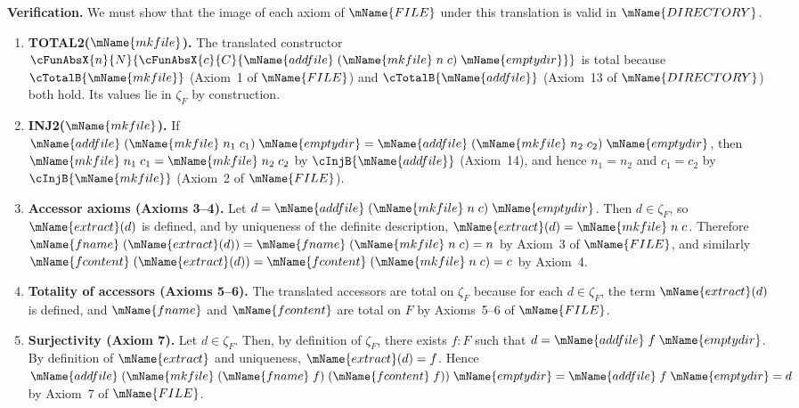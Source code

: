 \documentclass[11pt]{article}
\newcommand{\FILETYPE}{\mName{FILE}}
\newcommand{\DIR}{\mName{DIRECTORY}}
\newcommand{\mkfile}{\mName{mkfile}}
\newcommand{\fname}{\mName{fname}}
\newcommand{\fcontent}{\mName{fcontent}}
\begin{document}
\medskip
\noindent\textbf{Verification.}
We must show that the image of each axiom of $\FILETYPE$ under this
translation is valid in $\DIR$.

\begin{enumerate}
  \item \textbf{TOTAL2($\mkfile$).}
    The translated constructor
    $\cFunAbsX{n}{N}{\cFunAbsX{c}{C}{
        \mName{addfile}\;(\mkfile\;n\;c)\;\mName{emptydir}}}$
    is total because $\cTotalB{\mkfile}$ (Axiom~1 of $\FILETYPE$)
    and $\cTotalB{\mName{addfile}}$ (Axiom~13 of $\DIR$) both hold.
    Its values lie in $\zeta_F$ by construction.

  \item \textbf{INJ2($\mkfile$).}
    If $\mName{addfile}\;(\mkfile\;n_1\;c_1)\;\mName{emptydir}
      =
      \mName{addfile}\;(\mkfile\;n_2\;c_2)\;\mName{emptydir}$,
    then $\mkfile\;n_1\;c_1 = \mkfile\;n_2\;c_2$ by
    $\cInjB{\mName{addfile}}$ (Axiom~14), and hence
    $n_1 = n_2$ and $c_1 = c_2$ by $\cInjB{\mkfile}$
    (Axiom~2 of $\FILETYPE$).

  \item \textbf{Accessor axioms (Axioms 3--4).}
    Let $d = \mName{addfile}\;(\mkfile\;n\;c)\;\mName{emptydir}$.
    Then $d \in \zeta_F$, so $\mName{extract}(d)$ is defined, and
    by uniqueness of the definite description, $\mName{extract}(d) = \mkfile\;n\;c$.
    Therefore $\fname\;(\mName{extract}(d))
      = \fname\;(\mkfile\;n\;c) = n$
    by Axiom~3 of $\FILETYPE$, and similarly 
    $\fcontent\;(\mName{extract}(d))
      = \fcontent\;(\mkfile\;n\;c) = c$
    by Axiom~4.

  \item \textbf{Totality of accessors (Axioms 5--6).}
    The translated accessors are total on $\zeta_F$ because for each
    $d \in \zeta_F$, the term $\mName{extract}(d)$ is defined, and
    $\fname$ and $\fcontent$ are total on $F$ by Axioms~5--6 of
    $\FILETYPE$.

  \item \textbf{Surjectivity (Axiom 7).}
    Let $d \in \zeta_F$.  Then, by definition of $\zeta_F$, there
    exists $f : F$ such that 
    $d = \mName{addfile}\;f\;\mName{emptydir}$.
    By definition of $\mName{extract}$ and uniqueness,
    $\mName{extract}(d)=f$.  Hence
      $\mName{addfile}\;(\mkfile\;(\fname\;f)\;(\fcontent\;f))\;\mName{emptydir}
      =
      \mName{addfile}\;f\;\mName{emptydir}
      = d$
    by Axiom~7 of $\FILETYPE$.
\end{enumerate}
\end{document}
